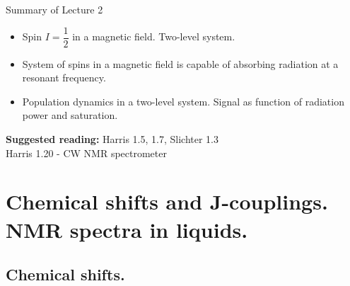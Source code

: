 \documentclass[handout]{beamer}
\begin{document}
\begin{frame}{Summary of Lecture 2}
	\begin{itemize}
		\item Spin $I= \dfrac{1}{2}$ in a magnetic field. Two-level system.
		\item System of spins in a magnetic field is capable of absorbing radiation at a resonant frequency.
		\item Population dynamics in a two-level system. Signal as function of radiation power and saturation.
	\end{itemize}
	\textbf{Suggested reading: } Harris 1.5, 1.7, Slichter 1.3 \\
	Harris 1.20 - CW NMR spectrometer
\end{frame}

\section{Chemical shifts and J-couplings. NMR spectra in liquids.}
\subsection{Chemical shifts.}
\end{document}
